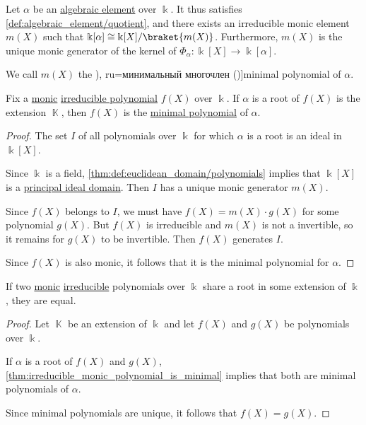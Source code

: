 \begin{definition}\label{def:algebraic_element_minimal_polynomial}
  Let \( \alpha \) be an \hyperref[def:algebraic_element]{algebraic element} over \( \Bbbk \). It thus satisfies \cref{def:algebraic_element/quotient}, and there exists an irreducible monic element \( m(X) \) such that \( \Bbbk[\alpha] \cong \Bbbk[X] / \braket{ m(X) } \). Furthermore, \( m(X) \) is the unique monic generator of the kernel of \( \Phi_\alpha: \Bbbk[X] \to \Bbbk[\alpha] \).

  We call \( m(X) \) the \term[bg=минимален полином (\cite[def. VI.2]{ГеновМиховскиМоллов1991Алгебра}), ru=минимальный многочлен (\cite[410]{Винберг2014КурсАлгебры})]{minimal polynomial} of \( \alpha \).
\end{definition}

\begin{proposition}\label{thm:irreducible_monic_polynomial_is_minimal}
  Fix a \hyperref[def:monic_polynomial]{monic} \hyperref[def:domain_divisibility/irreducible]{irreducible polynomial} \( f(X) \) over \( \Bbbk \). If \( \alpha \) is a root of \( f(X) \) is the extension \( \BbbK \), then \( f(X) \) is the \hyperref[def:algebraic_element_minimal_polynomial]{minimal polynomial} of \( \alpha \).
\end{proposition}
\begin{proof}
  The set \( I \) of all polynomials over \( \Bbbk \) for which \( \alpha \) is a root is an ideal in \( \Bbbk[X] \).

  Since \( \Bbbk \) is a field, \cref{thm:def:euclidean_domain/polynomials} implies that \( \Bbbk[X] \) is a \hyperref[def:principal_ideal_domain]{principal ideal domain}. Then \( I \) has a unique monic generator \( m(X) \).

  Since \( f(X) \) belongs to \( I \), we must have \( f(X) = m(X) \cdot g(X) \) for some polynomial \( g(X) \). But \( f(X) \) is irreducible and \( m(X) \) is not a invertible, so it remains for \( g(X) \) to be invertible. Then \( f(X) \) generates \( I \).

  Since \( f(X) \) is also monic, it follows that it is the minimal polynomial for \( \alpha \).
\end{proof}

\begin{corollary}\label{thm:irreducible_monic_polynomial_equal_roots}
  If two \hyperref[def:monic_polynomial]{monic} \hyperref[def:domain_divisibility/irreducible]{irreducible} polynomials over \( \Bbbk \) share a root in some extension of \( \Bbbk \), they are equal.
\end{corollary}
\begin{proof}
  Let \( \BbbK \) be an extension of \( \Bbbk \) and let \( f(X) \) and \( g(X) \) be polynomials over \( \Bbbk \).

  If \( \alpha \) is a root of \( f(X) \) and \( g(X) \), \cref{thm:irreducible_monic_polynomial_is_minimal} implies that both are minimal polynomials of \( \alpha \).

  Since minimal polynomials are unique, it follows that \( f(X) = g(X) \).
\end{proof}

